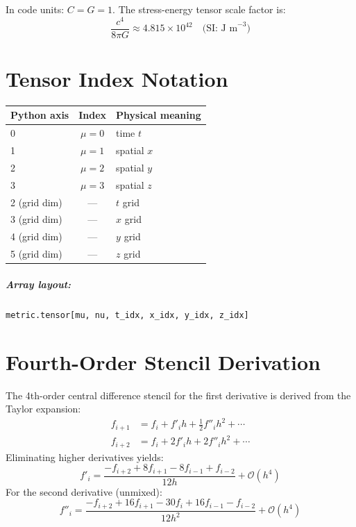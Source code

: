 \documentclass[11pt, a4paper, twoside]{report}
\begin{document}
In code units: $C = G = 1$.  The stress-energy tensor scale factor is:
\begin{equation}
  \frac{c^4}{8\pi G}
  \approx 4.815 \times 10^{42} \quad \text{(SI: J m}^{-3}\text{)}
\end{equation}

\chapter{Tensor Index Notation}
\label{app:indices}

\begin{center}
\begin{tabular}{lcl}
  \toprule
  Python axis & Index & Physical meaning \\
  \midrule
  0 & $\mu = 0$ & time $t$ \\
  1 & $\mu = 1$ & spatial $x$ \\
  2 & $\mu = 2$ & spatial $y$ \\
  3 & $\mu = 3$ & spatial $z$ \\
  \midrule
  2 (grid dim) & — & $t$ grid \\
  3 (grid dim) & — & $x$ grid \\
  4 (grid dim) & — & $y$ grid \\
  5 (grid dim) & — & $z$ grid \\
  \bottomrule
\end{tabular}
\end{center}

\paragraph{Array layout:}
\texttt{metric.tensor[mu, nu, t\_idx, x\_idx, y\_idx, z\_idx]}

\chapter{Fourth-Order Stencil Derivation}
\label{app:fd}

The 4th-order central difference stencil for the first derivative is
derived from the Taylor expansion:
\begin{align*}
  f_{i+1} &= f_i + f'_i h + \tfrac{1}{2}f''_i h^2 + \cdots \\
  f_{i+2} &= f_i + 2f'_i h + 2f''_i h^2 + \cdots
\end{align*}
Eliminating higher derivatives yields:
\begin{equation}
  f'_i = \frac{-f_{i+2} + 8f_{i+1} - 8f_{i-1} + f_{i-2}}{12h}
  + \mathcal{O}(h^4)
\end{equation}
For the second derivative (unmixed):
\begin{equation}
  f''_i = \frac{-f_{i+2} + 16f_{i+1} - 30f_i + 16f_{i-1} - f_{i-2}}{12h^2}
  + \mathcal{O}(h^4)
\end{equation}
\end{document}
